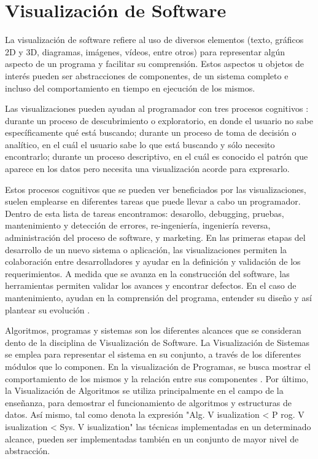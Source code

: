 \section{Visualización de Software}

La visualización de software refiere al uso de diversos elementos (texto, 
gráficos 2D y 3D, diagramas, imágenes, vídeos, entre otros) para representar algún
aspecto de un programa y facilitar su comprensión.\cite{PetreDeQuincey06,Chen06}
\cite{[GH01]}
Estos aspectos u objetos de interés pueden ser abstracciones de componentes, de
un sistema completo e incluso del comportamiento en tiempo en ejecución de los
mismos. \cite{TeysereCampo09}

Las visualizaciones pueden ayudan al programador con tres procesos cognitivos
\cite{ButlerAlmond93}:
durante un proceso de descubrimiento o exploratorio, en donde el usuario no
sabe específicamente qué está buscando;
durante un proceso de toma de decisión o analítico, en el cuál el usuario sabe lo que
está buscando y sólo necesito encontrarlo;
durante un proceso descriptivo, en el cuál es conocido el patrón que aparece en los
datos pero necesita una visualización acorde para expresarlo.

Estos procesos cognitivos que se pueden ver beneficiados por las visualizaciones, suelen
emplearse en diferentes tareas que puede llevar a cabo un programador.
Dentro de esta lista de tareas \cite{MalleticMarcusCollard02} encontramos: desarollo,
debugging, pruebas, mantenimiento y detección de errores, re-ingeniería, ingeniería reversa,
administración del proceso de software, y marketing.
En las primeras etapas del desarrollo de un nuevo sistema o aplicación, las visualizaciones
permiten la colaboración entre desarrolladores y ayudar en la definición y validación de los
requerimientos.
A medida que se avanza en la construcción del software, las herramientas permiten validar
los avances y encontrar defectos.
En el caso de mantenimiento, ayudan en la comprensión del programa, entender su diseño y
así plantear su evolución \cite{PetreDeQuincey06}.

Algoritmos, programas y sistemas son los diferentes alcances que se consideran
dento de la disciplina de Visualización de Software.\cite{[PBS93][Mye90]}
La Visualización de Sistemas se emplea para representar el sistema en su conjunto,
a través de los diferentes módulos que lo componen.
En la visualización de Programas, se busca mostrar el comportamiento de los mismos
y la relación entre sus componentes \cite{BA01}.
Por último, la Visualización de Algoritmos se utiliza principalmente en el campo de la enseñanza,
para demostrar el funcionamiento de algoritmos y estructuras de datos.
Así mismo, tal como denota la expresión 
"Alg. V isualization < P rog. V isualization < Sys. V isualization"\cite{PIROBV-YDS-2007}
las técnicas implementadas en un determinado alcance, pueden ser implementadas
también en un conjunto de mayor nivel de abstracción.

